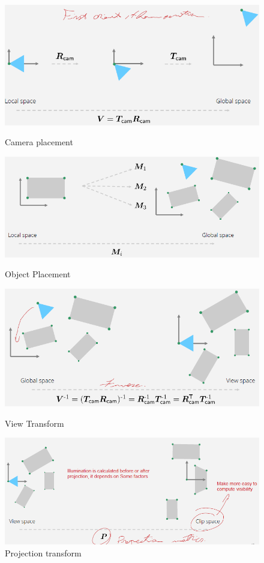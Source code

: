 \documentclass{article}
\begin{document}
\begin{figure}
\includegraphics[scale=0.6]{image48.png}
\caption{Camera placement}
\includegraphics[scale=0.6]{image49.png}
\caption{Object Placement}
\includegraphics[scale=0.6]{image50.png}
\caption{View Transform}
\includegraphics[scale=0.6]{image51.png}
\caption{Projection transform}
\end{figure}
\end{document}
